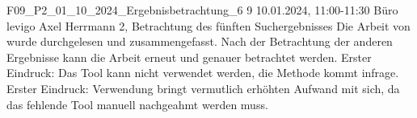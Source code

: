 \fieldnote
{F09\_P2\_01\_10\_2024\_Ergebnisbetrachtung\_6}
{9}
{10.01.2024, 11:00-11:30}
{Büro levigo}
{Axel Herrmann}
{2, Betrachtung des fünften Suchergebnisses}
{
  Die Arbeit von  wurde durchgelesen und zusammengefasst.
}
{
  Nach der Betrachtung der anderen Ergebnisse kann die Arbeit erneut und genauer betrachtet werden.
}
{
  Erster Eindruck: Das Tool kann nicht verwendet werden, die Methode kommt infrage.
}
{
  Erster Eindruck: Verwendung bringt vermutlich erhöhten Aufwand mit sich, da das fehlende Tool manuell nachgeahmt werden muss.
}
{
}
